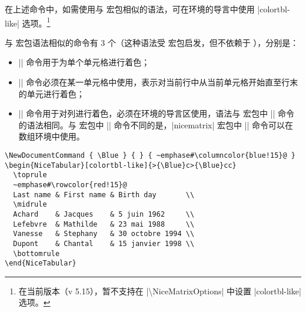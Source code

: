 \documentclass[dvipsnames]{article}%
\def\nicematrixfileversion{5.15}
\begin{document}
在上述命令中，如需使用与  宏包相似的语法，可在环境的导言中使用 |colortbl-like| 选项。\footnote{在当前版本（v \nicematrixfileversion），暂不支持在 |\textbackslash NiceMatrixOptions| 中设置 |colortbl-like| 选项。}

与  宏包语法相似的命令有 3 个（这种语法受  宏包启发，但不依赖于 ），分别是：
\begin{itemize}
\item |\cellcolor| 命令用于为单个单元格进行着色；
\item |\rowcolor| 命令必须在某一单元格中使用，表示对当前行中从当前单元格开始直至行末的单元进行着色；\label{zm:rowcolor}
\item |\columncolor| 命令用于对列进行着色，必须在环境的导言区使用，语法与  宏包中 |\columncolor| 命令的语法相同。与  宏包中 |\columncolor| 命令不同的是，|nicematrix| 宏包中 |\columncolor| 命令可以在数组环境中使用。
\end{itemize}

\medskip
\begin{Verbatim}
\NewDocumentCommand { \Blue } { } { ~emphase#\columncolor{blue!15}@ }
\begin{NiceTabular}[colortbl-like]{>{\Blue}c>{\Blue}cc} 
  \toprule
  ~emphase#\rowcolor{red!15}@
  Last name & First name & Birth day       \\
  \midrule
  Achard    & Jacques    & 5 juin 1962     \\
  Lefebvre  & Mathilde   & 23 mai 1988     \\
  Vanesse   & Stephany   & 30 octobre 1994 \\
  Dupont    & Chantal    & 15 janvier 1998 \\
  \bottomrule
\end{NiceTabular}
\end{Verbatim}
\end{document}
